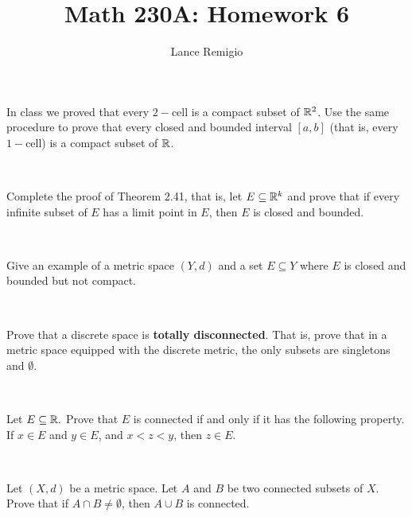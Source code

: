 \documentclass[a4paper]{article}
\title{Math 230A: Homework 6}
\author{Lance Remigio}
\begin{document}
\maketitle    
{}
\rhead{\thepage}

\begin{problem}
    In class we proved that every \( 2- \)cell is a compact subset of \( \mathbb{R}^{2} \). Use the same procedure to prove that every closed and bounded interval \( [a,b] \) (that is, every \( 1- \)cell) is a compact subset of \( \mathbb{R}  \).
\end{problem}



\newpage

\ 

\newpage


\begin{problem}
    Complete the proof of Theorem 2.41, that is, let \( E \subseteq  \mathbb{R}^{k} \) and prove that if every infinite subset of \( E  \) has a limit point in \( E  \), then \( E  \) is closed and bounded.
\end{problem}

\newpage

\ 

\newpage
\begin{problem}
    Give an example of a metric space \( (Y,d) \) and a set \( E \subseteq Y \) where \( E  \) is closed and bounded but not compact.
\end{problem}

\newpage

\

\newpage


\begin{problem}
    Prove that a discrete space is \textbf{totally disconnected}. That is, prove that in a metric space equipped with the discrete metric, the only subsets are singletons and \( \emptyset \).
\end{problem}
\newpage

\

\newpage
\begin{problem}
    Let \( E \subseteq \mathbb{R} .  \) Prove that \( E  \) is connected if and only if it has the following property. If \( x \in E  \) and \( y \in E  \), and \( x < z < y  \), then \( z \in E  \).
\end{problem}
\newpage

\

\newpage
\begin{problem}
    Let \( (X,d) \) be a metric space. Let \( A  \) and \( B  \) be two connected subsets of \( X  \). Prove that if \( A \cap B \neq \emptyset  \), then \( A \cup B  \) is connected.
\end{problem}
\newpage
\end{document}
